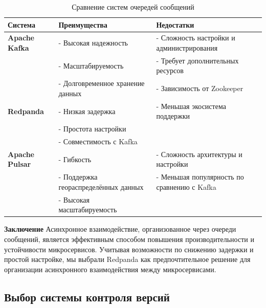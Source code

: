 \begin{table}[h]
    \centering
    \begin{tabular}{|l|l|l|}
        \hline
        \textbf{Система}            & \textbf{Преимущества}                          & \textbf{Недостатки}                                \\ \hline
        \textbf{Apache Kafka}       & - Высокая надежность                    & - Сложность настройки и администрирования     \\ \hline
                                   & - Масштабируемость                       & - Требует дополнительных ресурсов              \\ \hline
                                   & - Долговременное хранение данных         & - Зависимость от Zookeeper                      \\ \hline
        \textbf{Redpanda}           & - Низкая задержка                        & - Меньшая экосистема поддержки                 \\ \hline
                                   & - Простота настройки                     &                                                \\ \hline
                                   & - Совместимость с Kafka                 &                                                \\ \hline
        \textbf{Apache Pulsar}      & - Гибкость                               & - Сложность архитектуры и настройки            \\ \hline
                                   & - Поддержка геораспределённых данных    & - Меньшая популярность по сравнению с Kafka    \\ \hline
                                   & - Высокая масштабируемость              &                                                \\ \hline
    \end{tabular}
    \caption{Сравнение систем очередей сообщений}
\end{table}

\textbf{Заключение}
Асинхронное взаимодействие, организованное через очереди сообщений, является эффективным способом повышения производительности и устойчивости микросервисов. Учитывая возможности по снижению задержки и простой настройке, мы выбрали Redpanda как предпочтительное решение для организации асинхронного взаимодействия между микросервисами.

\subsection{Выбор системы контроля версий}
